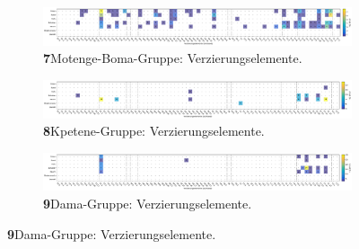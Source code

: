 \addtocounter{figure}{-1}
\begin{figure}

\centering
\begin{subfigure}{\textwidth}
	\setcounter{subfigure}{6}
	\centering
	\includegraphics[width=\textwidth]{fig/MTB_Verzierungselmente.pdf}
	\caption*{\textbf{7}\hspace{1em}Motenge-Boma-Gruppe: Verzierungselemente. \vspace{\baselineskip}}
	\label{fig:MTB_Verz}
\end{subfigure}

\begin{subfigure}{\textwidth}
	\centering
	\includegraphics[width=\textwidth]{fig/KPT_Verzierungselmente.pdf}
	\caption*{\textbf{8}\hspace{1em}Kpetene-Gruppe: Verzierungselemente. \vspace{\baselineskip}}
	\label{fig:KPT_Verz}
\end{subfigure}

\begin{subfigure}{\textwidth}
	\centering
	\includegraphics[width=\textwidth]{fig/DAM_Verzierungselmente.pdf}
	\caption*{\textbf{9}\hspace{1em}Dama-Gruppe: Verzierungselemente. \vspace{\baselineskip}}
	\label{fig:DAM_Verz}
\end{subfigure}
\end{figure}

